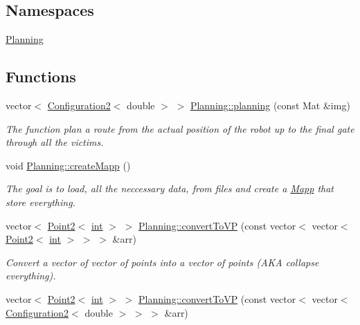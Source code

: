 \subsection*{Namespaces}
\begin{DoxyCompactItemize}
\item 
 \mbox{\hyperlink{namespace_planning}{Planning}}
\end{DoxyCompactItemize}
\subsection*{Functions}
\begin{DoxyCompactItemize}
\item 
vector$<$ \mbox{\hyperlink{class_configuration2}{Configuration2}}$<$ double $>$ $>$ \mbox{\hyperlink{namespace_planning_a917977f5667fee899252864d88830f78}{Planning\+::planning}} (const Mat \&img)
\begin{DoxyCompactList}\small\item\em The function plan a route from the actual position of the robot up to the final gate through all the victims. \end{DoxyCompactList}\item 
void \mbox{\hyperlink{namespace_planning_ab3962a61cb050b623abd1720107d2ea5}{Planning\+::create\+Mapp}} ()
\begin{DoxyCompactList}\small\item\em The goal is to load, all the neccessary data, from files and create a \mbox{\hyperlink{class_mapp}{Mapp}} that store everything. \end{DoxyCompactList}\item 
vector$<$ \mbox{\hyperlink{class_point2}{Point2}}$<$ \mbox{\hyperlink{draw_8hh_aa620a13339ac3a1177c86edc549fda9b}{int}} $>$ $>$ \mbox{\hyperlink{namespace_planning_a42e39a8167b883f4c838a7578266ea42}{Planning\+::convert\+To\+VP}} (const vector$<$ vector$<$ \mbox{\hyperlink{class_point2}{Point2}}$<$ \mbox{\hyperlink{draw_8hh_aa620a13339ac3a1177c86edc549fda9b}{int}} $>$ $>$ $>$ \&arr)
\begin{DoxyCompactList}\small\item\em Convert a vector of vector of points into a vector of points (A\+KA collapse everything). \end{DoxyCompactList}\item 
vector$<$ \mbox{\hyperlink{class_point2}{Point2}}$<$ \mbox{\hyperlink{draw_8hh_aa620a13339ac3a1177c86edc549fda9b}{int}} $>$ $>$ \mbox{\hyperlink{namespace_planning_a116566c3be0464d544c772de25cead67}{Planning\+::convert\+To\+VP}} (const vector$<$ vector$<$ \mbox{\hyperlink{class_configuration2}{Configuration2}}$<$ double $>$ $>$ $>$ \&arr)

\end{DoxyCompactItemize}
